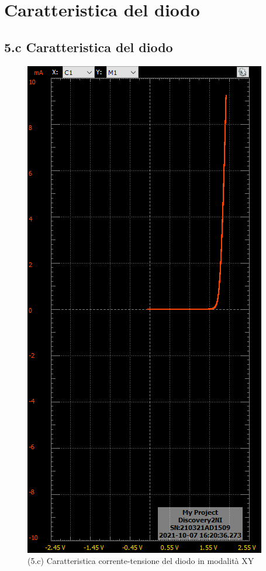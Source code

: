\documentclass[10pt,a4paper]{article}
\begin{document}
\section{Caratteristica del diodo}
\par

\subsection*{5.c Caratteristica del diodo}

\begin{figure}[htb]
\centering
\includegraphics[scale=0.4]{shockley_new}
\caption{(5.c) Caratteristica corrente-tensione del diodo in modalit\`a XY}
\end{figure}
\end{document}
